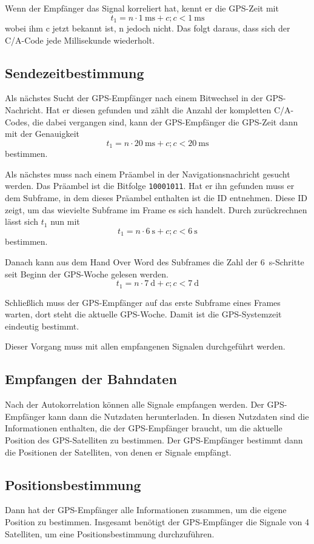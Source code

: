\documentclass[12pt,a4paper]{scrartcl}
\begin{document}
Wenn der Empfänger das Signal korreliert hat, kennt er die GPS-Zeit mit $$t_1 = n\cdot\SI{1}{\milli\second} + c; c<\SI{1}{\milli\second}$$ wobei ihm c jetzt bekannt ist, n jedoch nicht. Das folgt daraus, dass sich der C/A-Code jede Millisekunde wiederholt.

\subsection{Sendezeitbestimmung}
Als nächstes Sucht der GPS-Empfänger nach einem Bitwechsel in der GPS-Nachricht. Hat er diesen gefunden und zählt die Anzahl der kompletten C/A-Codes, die dabei vergangen sind, kann der GPS-Empfänger die GPS-Zeit dann mit der Genauigkeit  $$t_1 = n\cdot\SI{20}{\milli\second} + c; c<\SI{20}{\milli\second}$$ bestimmen.

Als nächstes muss nach einem Präambel in der Navigationsnachricht gesucht werden. Das Präambel ist die Bitfolge \texttt{10001011}. Hat er ihn gefunden muss er dem Subframe, in dem dieses Präambel enthalten ist die ID entnehmen. Diese ID zeigt, um das wievielte Subframe im Frame es sich handelt. Durch zurückrechnen lässt sich $t_1$ nun mit $$t_1 = n\cdot\SI{6}{\second} + c; c<\SI{6}{\second}$$ bestimmen.

Danach kann aus dem Hand Over Word des Subframes die Zahl der \SI{6}{\second}-Schritte seit Beginn der GPS-Woche gelesen werden. $$t_1 = n\cdot\SI{7}{\day} + c; c<\SI{7}{\day}$$

Schließlich muss der GPS-Empfänger auf das erste Subframe eines Frames warten, dort steht die aktuelle GPS-Woche. Damit ist die GPS-Systemzeit eindeutig bestimmt.

Dieser Vorgang muss mit allen empfangenen Signalen durchgeführt werden.

\subsection{Empfangen der Bahndaten}
Nach der Autokorrelation können alle Signale empfangen werden. Der GPS-Empfänger kann dann die Nutzdaten herunterladen. In diesen Nutzdaten sind die Informationen enthalten, die der GPS-Empfänger braucht, um die aktuelle Position des GPS-Satelliten zu bestimmen. Der GPS-Empfänger bestimmt dann die Positionen der Satelliten, von denen er Signale empfängt.

\subsection{Positionsbestimmung}
Dann hat der GPS-Empfänger alle Informationen zusammen, um die eigene Position zu bestimmen. Insgesamt benötigt der GPS-Empfänger die Signale von 4 Satelliten, um eine Positionsbestimmung durchzuführen.
\end{document}
